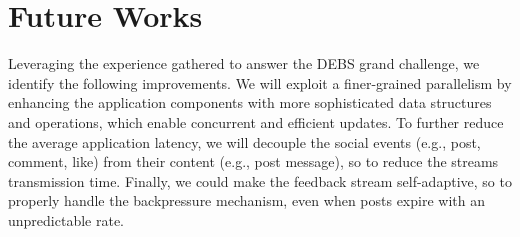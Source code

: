 \section{Future Works}
\label{sec:future-works}


Leveraging the experience gathered to answer the DEBS grand challenge, we identify the following improvements. 
%
We will exploit a finer-grained parallelism by enhancing the application components with more sophisticated data structures and operations, which enable concurrent and efficient updates.
%
To further reduce the average application latency, we will decouple the social events (e.g., post, comment, like) from their content (e.g., post message), so to reduce the streams transmission time.
%
Finally, we could make the feedback stream self-adaptive, so to properly handle the  backpressure mechanism, even when posts expire with an unpredictable rate.


